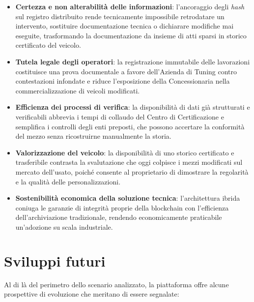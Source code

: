 \begin{itemize}
    \item \textbf{Certezza e non alterabilit\`a delle informazioni}: l'ancoraggio degli \textit{hash} sul registro distribuito rende tecnicamente impossibile retrodatare un intervento, sostituire documentazione tecnica o dichiarare modifiche mai eseguite, trasformando la documentazione da insieme di atti sparsi in storico certificato del veicolo.

    \item \textbf{Tutela legale degli operatori}: la registrazione immutabile delle lavorazioni costituisce una prova documentale a favore dell'Azienda di Tuning contro contestazioni infondate e riduce l'esposizione della Concessionaria nella commercializzazione di veicoli modificati.

    \item \textbf{Efficienza dei processi di verifica}: la disponibilit\`a di dati gi\`a strutturati e verificabili abbrevia i tempi di collaudo del Centro di Certificazione e semplifica i controlli degli enti preposti, che possono accertare la conformit\`a del mezzo senza ricostruirne manualmente la storia.

    \item \textbf{Valorizzazione del veicolo}: la disponibilit\`a di uno storico certificato e trasferibile contrasta la svalutazione che oggi colpisce i mezzi modificati sul mercato dell'usato, poich\'e consente al proprietario di dimostrare la regolarit\`a e la qualit\`a delle personalizzazioni.

    \item \textbf{Sostenibilit\`a economica della soluzione tecnica}: l'architettura ibrida coniuga le garanzie di integrit\`a proprie della blockchain con l'efficienza dell'archiviazione tradizionale, rendendo economicamente praticabile un'adozione su scala industriale.
\end{itemize}

\section*{Sviluppi futuri}

Al di l\`a del perimetro dello scenario analizzato, la piattaforma offre alcune prospettive di evoluzione che meritano di essere segnalate:

